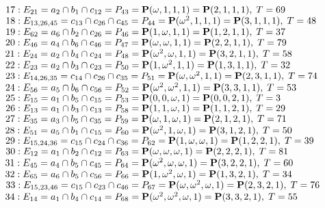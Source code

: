 \documentclass{article}
\newcommand{\bP}{{\bf P}}
\begin{document}
{$17 : E_{21}=a_{2} \cap b_{1} \cap c_{12} = P_{43}=\bP(\omega , 1, 1, 1) = \bP(2, 1, 1, 1),\; T= 69$\\
$18 : E_{13,26,45}=c_{13} \cap c_{26} \cap c_{45} = P_{44}=\bP(\omega^{2}, 1, 1, 1) = \bP(3, 1, 1, 1),\; T= 48$\\
$19 : E_{62}=a_{6} \cap b_{2} \cap c_{26} = P_{46}=\bP(1, \omega , 1, 1) = \bP(1, 2, 1, 1),\; T= 37$\\
$20 : E_{46}=a_{4} \cap b_{6} \cap c_{46} = P_{47}=\bP(\omega , \omega , 1, 1) = \bP(2, 2, 1, 1),\; T= 79$\\
$21 : E_{24}=a_{2} \cap b_{4} \cap c_{24} = P_{48}=\bP(\omega^{2}, \omega , 1, 1) = \bP(3, 2, 1, 1),\; T= 58$\\
$22 : E_{23}=a_{2} \cap b_{3} \cap c_{23} = P_{50}=\bP(1, \omega^{2}, 1, 1) = \bP(1, 3, 1, 1),\; T= 32$\\
$23 : E_{14,26,35}=c_{14} \cap c_{26} \cap c_{35} = P_{51}=\bP(\omega , \omega^{2}, 1, 1) = \bP(2, 3, 1, 1),\; T= 74$\\
$24 : E_{56}=a_{5} \cap b_{6} \cap c_{56} = P_{52}=\bP(\omega^{2}, \omega^{2}, 1, 1) = \bP(3, 3, 1, 1),\; T= 53$\\
$25 : E_{15}=a_{1} \cap b_{5} \cap c_{15} = P_{53}=\bP(0, 0, \omega , 1) = \bP(0, 0, 2, 1),\; T= 3$\\
$26 : E_{13}=a_{1} \cap b_{3} \cap c_{13} = P_{58}=\bP(1, 1, \omega , 1) = \bP(1, 1, 2, 1),\; T= 29$\\
$27 : E_{35}=a_{3} \cap b_{5} \cap c_{35} = P_{59}=\bP(\omega , 1, \omega , 1) = \bP(2, 1, 2, 1),\; T= 71$\\
$28 : E_{51}=a_{5} \cap b_{1} \cap c_{15} = P_{60}=\bP(\omega^{2}, 1, \omega , 1) = \bP(3, 1, 2, 1),\; T= 50$\\
$29 : E_{15,24,36}=c_{15} \cap c_{24} \cap c_{36} = P_{62}=\bP(1, \omega , \omega , 1) = \bP(1, 2, 2, 1),\; T= 39$\\
$30 : E_{12}=a_{1} \cap b_{2} \cap c_{12} = P_{63}=\bP(\omega , \omega , \omega , 1) = \bP(2, 2, 2, 1),\; T= 81$\\
$31 : E_{45}=a_{4} \cap b_{5} \cap c_{45} = P_{64}=\bP(\omega^{2}, \omega , \omega , 1) = \bP(3, 2, 2, 1),\; T= 60$\\
$32 : E_{65}=a_{6} \cap b_{5} \cap c_{56} = P_{66}=\bP(1, \omega^{2}, \omega , 1) = \bP(1, 3, 2, 1),\; T= 34$\\
$33 : E_{15,23,46}=c_{15} \cap c_{23} \cap c_{46} = P_{67}=\bP(\omega , \omega^{2}, \omega , 1) = \bP(2, 3, 2, 1),\; T= 76$\\
$34 : E_{14}=a_{1} \cap b_{4} \cap c_{14} = P_{68}=\bP(\omega^{2}, \omega^{2}, \omega , 1) = \bP(3, 3, 2, 1),\; T= 55$\\
}
\end{document}
